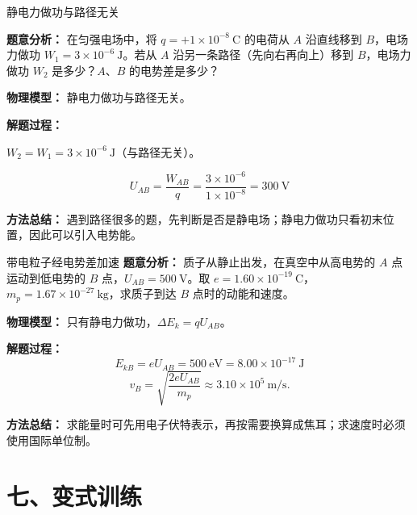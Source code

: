 \begin{examplebox}{静电力做功与路径无关}

\textbf{题意分析：} 在匀强电场中，将 $q = +1 \times 10^{-8}\ \mathrm{C}$ 的电荷从 $A$ 沿直线移到 $B$，电场力做功 $W_1 = 3 \times 10^{-6}\ \mathrm{J}$。若从 $A$ 沿另一条路径（先向右再向上）移到 $B$，电场力做功 $W_2$ 是多少？$A$、$B$ 的电势差是多少？

\textbf{物理模型：} 静电力做功与路径无关。

\textbf{解题过程：}

$W_2 = W_1 = 3 \times 10^{-6}\ \mathrm{J}$（与路径无关）。

\[
U_{AB} = \frac{W_{AB}}{q} = \frac{3 \times 10^{-6}}{1 \times 10^{-8}} = 300\ \mathrm{V}
\]

\textbf{方法总结：} 遇到路径很多的题，先判断是否是静电场；静电力做功只看初末位置，因此可以引入电势能。

\end{examplebox}

\begin{examplebox}{带电粒子经电势差加速}
\textbf{题意分析：} 质子从静止出发，在真空中从高电势的 $A$ 点运动到低电势的 $B$ 点，$U_{AB}=500\ \mathrm V$。取
$e=1.60\times10^{-19}\ \mathrm C$，
$m_p=1.67\times10^{-27}\ \mathrm{kg}$，求质子到达 $B$ 点时的动能和速度。

\textbf{物理模型：} 只有静电力做功，$\Delta E_k=qU_{AB}$。

\textbf{解题过程：}
\[
E_{kB}=eU_{AB}=500\ \mathrm{eV}
=8.00\times10^{-17}\ \mathrm J
\]
\[
v_B=\sqrt{\frac{2eU_{AB}}{m_p}}
\approx3.10\times10^5\ \mathrm{m/s}.
\]

\textbf{方法总结：} 求能量时可先用电子伏特表示，再按需要换算成焦耳；求速度时必须使用国际单位制。
\end{examplebox}

\section*{七、变式训练}

